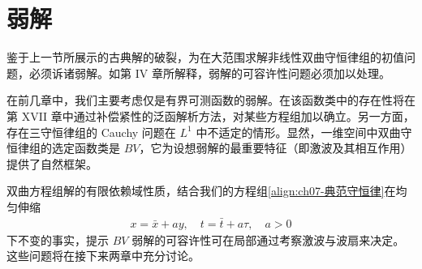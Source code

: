 \documentclass[../../main.tex]{subfiles}
\begin{document}
\section{弱解}\label{section:ch07-弱解}

鉴于上一节所展示的古典解的破裂，为在大范围求解非线性双曲守恒律组的初值问题，必须诉诸弱解。如第 IV 章所解释，弱解的可容许性问题必须加以处理。

在前几章中，我们主要考虑仅是有界可测函数的弱解。在该函数类中的存在性将在第 XVII 章中通过补偿紧性的泛函解析方法，对某些方程组加以确立。另一方面，存在三守恒律组的 Cauchy 问题在 $L^1$ 中不适定的情形。显然，一维空间中双曲守恒律组的选定函数类是 $BV$，它为设想弱解的最重要特征（即激波及其相互作用）提供了自然框架。

双曲方程组解的有限依赖域性质，结合我们的方程组\eqref{align:ch07-典范守恒律}在均匀伸缩
\begin{align}
x=\bar{x}+a y,\quad t=\bar{t}+a\tau,\quad a>0
\label{align:ch07-均匀伸缩}
\end{align}
下不变的事实，提示 $BV$ 弱解的可容许性可在局部通过考察激波与波扇来决定。这些问题将在接下来两章中充分讨论。
\end{document}
